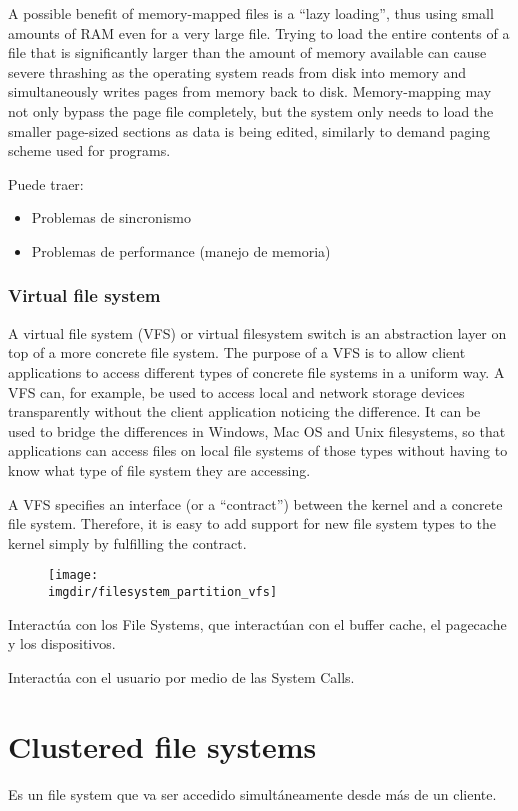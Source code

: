 \documentclass[a4paper, twoside]{article}
\newcommand{\imgdir}{../resources/images} %
\begin{document}
A possible benefit of memory-mapped files is a ``lazy loading'', thus using small amounts of RAM even for a very large file. Trying to load the entire contents of a file that is significantly larger than the amount of memory available can cause severe thrashing as the operating system reads from disk into memory and simultaneously writes pages from memory back to disk. Memory-mapping may not only bypass the page file completely, but the system only needs to load the smaller page-sized sections as data is being edited, similarly to demand paging scheme used for programs.

Puede traer:
\begin{itemize}
	\item Problemas de sincronismo
	\item Problemas de performance (manejo de memoria)
\end{itemize}

\subsubsection{Virtual file system}
A virtual file system (VFS) or virtual filesystem switch is an abstraction layer on top of a more concrete file system. The purpose of a VFS is to allow client applications to access different types of concrete file systems in a uniform way. A VFS can, for example, be used to access local and network storage devices transparently without the client application noticing the difference. It can be used to bridge the differences in Windows, Mac OS and Unix filesystems, so that applications can access files on local file systems of those types without having to know what type of file system they are accessing.

A VFS specifies an interface (or a ``contract'') between the kernel and a concrete file system. Therefore, it is easy to add support for new file system types to the kernel simply by fulfilling the contract.

\begin{figure}[h]
	\centering
	\texttt{[image: \\imgdir/filesystem\_partition\_vfs]}
	\label{fig:filesystem_partition_vfs}
\end{figure}

Interactúa con los File Systems, que interactúan con el buffer cache, el pagecache y los dispositivos.

Interactúa con el usuario por medio de las System Calls.

\newpage
\section{Clustered file systems}
Es un file system que va ser accedido simultáneamente desde más de un cliente.
\end{document}
